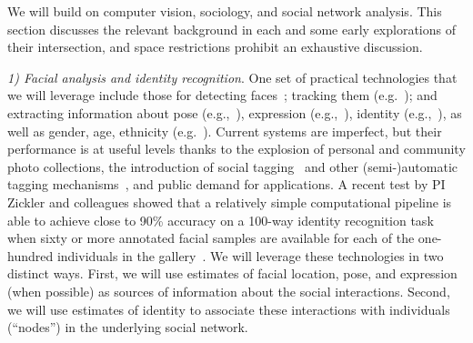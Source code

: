 \label{sec:background}

We will build on computer vision, sociology, and social network analysis. This section discusses the relevant background in each and some early explorations of their intersection, and space restrictions prohibit an exhaustive discussion. %


\emph{1) Facial analysis and identity recognition}. One set of practical technologies that we will leverage include those for detecting faces~\cite{ViolaJones,Zhang:detect}; tracking them (e.g.~\cite{Comaniciu:track}); and extracting information about pose (e.g.,~\cite{Hanson,Murphy-Chutorian:pose}), expression (e.g.,~\cite{Matthews:AAM,Lucey:AAM,Mumford:face,Yacoob:expression,delaTorre:expression,Essa:expression}), identity (e.g.,~\cite{Chellappa:face}), as well as gender, age, ethnicity (e.g.~\cite{LNCS53050340}).  Current systems are imperfect, but their performance is at useful levels thanks to the explosion of personal and community photo collections, the introduction of social tagging~\cite{Stone2008,Stone2010} and other (semi-)automatic tagging mechanisms~\cite{berg2004naf,berg2005sp,Everingham06a,huang:lfw,YangBKR12}, and public demand for applications. A recent test by PI Zickler and colleagues showed that a relatively simple computational pipeline is able to achieve close to 90\% accuracy on a 100-way identity recognition task when sixty or more annotated facial samples are available for each of the one-hundred individuals in the gallery~\cite{PintoZickler2011}. We will leverage these technologies in two distinct ways. First, we will use estimates of facial location, pose, and expression (when possible) as sources of information about the social interactions. Second, we will use estimates of identity to associate these interactions with individuals (``nodes'') in the underlying social network. 




